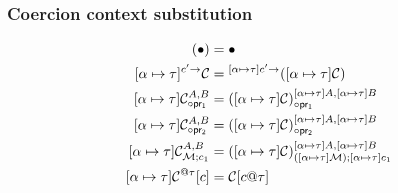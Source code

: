 \documentclass{article}
\begin{document}
\subsubsection{Coercion context substitution}
\begin{minipage}[t]{0.47\textwidth}
\begin{align*}
  [\substitution{\alpha}{\tau}](\bullet)                   &= \bullet\\
  [\substitution{\alpha}{\tau}]\arrCC{\mathcal{C}}{c'}     &= \arrCC{([\substitution{\alpha}{\tau}]\mathcal{C})}{[\substitution{\alpha}{\tau}]c'}\\
  [\substitution{\alpha}{\tau}]\projlCC{\mathcal{C}}{A}{B} &= \projlCC{([\substitution{\alpha}{\tau}]\mathcal{C})}{[\substitution{\alpha}{\tau}]A}{[\substitution{\alpha}{\tau}]B}\\
  [\substitution{\alpha}{\tau}]\projrCC{\mathcal{C}}{A}{B} &= \projrCC{([\substitution{\alpha}{\tau}]\mathcal{C})}{[\substitution{\alpha}{\tau}]A}{[\substitution{\alpha}{\tau}]B}\\
  [\substitution{\alpha}{\tau}]\mpCC{\mathcal{C}}{\mathcal{M}}{c_1}{A}{B} &= \mpCC{([\substitution{\alpha}{\tau}]\mathcal{C})}{([\substitution{\alpha}{\tau}]\mathcal{M})}{[\substitution{\alpha}{\tau}]c_1}{[\substitution{\alpha}{\tau}]A}{[\substitution{\alpha}{\tau}]B}\\
  [\substitution{\alpha}{\tau}]\alllCC{\mathcal{C}}{\tau}[c] &= \mathcal{C}[\alllC{c}{\tau}]
\end{align*}
\end{minipage}
\end{document}
